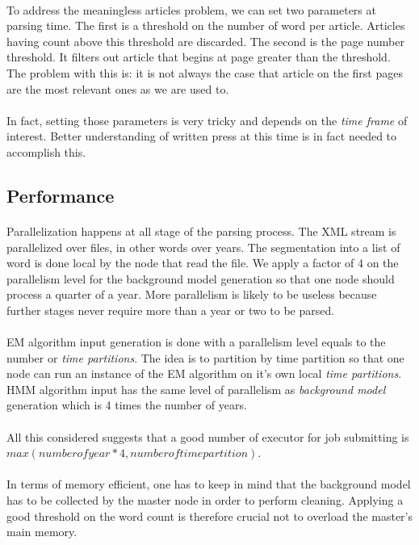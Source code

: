 \paragraph{}
To address the meaningless articles problem, we can set two parameters at parsing time. The first is a threshold on the number of word per article. Articles having count above this threshold are discarded. The second is the page number threshold. It filters out article that begins at page greater than the threshold. The problem with this is: it is not always the case that article on the first pages are the most relevant ones as we are used to.

\paragraph{}
In fact, setting those parameters is very tricky and depends on the \emph{time frame} of interest. Better understanding of written press at this time is in fact needed to accomplish this.

\subsection{Performance}
\paragraph{}
Parallelization happens at all stage of the parsing process. The XML stream is parallelized over files, in other words over years. The segmentation into a list of word is done local by the node that read the file. We apply a factor of 4 on the parallelism level for the background model generation so that one node should process a quarter of a year. More parallelism is likely to be useless because further stages never require more than a year or two to be parsed.

\paragraph{}
EM algorithm input generation is done with a parallelism level equals to the number or \emph{time partitions}. The idea is to partition by time partition so that one node can run an instance of the EM algorithm on it's own local  \emph{time partitions}. HMM algorithm input has the same level of parallelism as \emph{background model} generation which is 4 times the number of years. 

\paragraph{}
All this considered suggests that a good number of executor for job submitting is $max(number of year*4, number of time partition)$.

\paragraph{}
In terms of memory efficient, one has to keep in mind that the background model has to be collected by the master node in order to perform cleaning. Applying a good threshold on the word count is therefore crucial not to overload the master's main memory.



